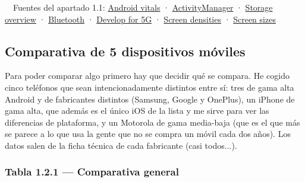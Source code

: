 \documentclass[11pt,a4paper]{article}
\begin{document}
	\begin{fuentesbox}
		\color{muted}\faBook\ \ Fuentes del apartado 1.1:
		\href{https://developer.android.com/topic/performance/vitals}{Android vitals} ·
		\href{https://developer.android.com/reference/android/app/ActivityManager}{ActivityManager} ·
		\href{https://developer.android.com/training/data-storage}{Storage overview} ·
		\href{https://developer.android.com/develop/connectivity/bluetooth}{Bluetooth} ·
		\href{https://developer.android.com/develop/connectivity/5g}{Develop for 5G} ·
		\href{https://developer.android.com/training/multiscreen/screendensities}{Screen densities} ·
		\href{https://developer.android.com/training/multiscreen/screensizes}{Screen sizes}
	\end{fuentesbox}
	
	\subsection{Comparativa de 5 dispositivos móviles}
	
	Para poder comparar algo primero hay que decidir qué se compara. He cogido cinco teléfonos que sean intencionadamente distintos entre sí: tres de gama alta Android y de fabricantes distintos (Samsung, Google y OnePlus), un iPhone de gama alta, que además es el único iOS de la lista y me sirve para ver las diferencias de plataforma, y un Motorola de gama media-baja (que es el que más se parece a lo que usa la gente que no se compra un móvil cada dos años). Los datos salen de la ficha técnica de cada fabricante (casi todos...).
	
	\subsubsection*{Tabla 1.2.1 --- Comparativa general}
	
\end{document}
